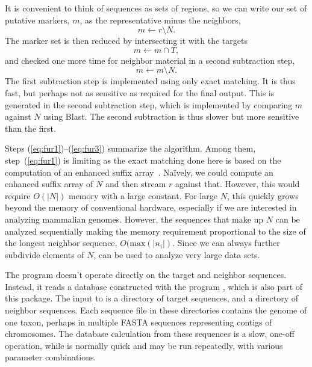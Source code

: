 It is convenient to think of sequences as sets of regions, so we can
write our set of putative markers, $m$, as the representative minus
the neighbors,
\begin{equation}\label{eq:fur1}
m \leftarrow r\setminus N.
\end{equation}
The marker set is then reduced by intersecting it with the targets
\begin{equation}\label{eq:fur2}
m \leftarrow m\cap T,
\end{equation}
and checked one more time for neighbor material in a second
subtraction step,
\begin{equation}\label{eq:fur3}
m \leftarrow m\setminus N.
\end{equation}
The first subtraction step is implemented using only exact
matching. It is thus fast, but perhaps not as sensitive as required
for the final output. This is generated in the second subtraction
step, which is implemented by comparing $m$ against $N$ using
Blast. The second subtraction is thus slower but more sensitive than
the first.

Steps (\ref{eq:fur1})--(\ref{eq:fur3}) summarize the 
algorithm. Among them, step~(\ref{eq:fur1}) is limiting as the exact
matching done here is based on the computation of an enhanced suffix
array~\cite{abo04:rep}. Naïvely, we could compute an enhanced suffix
array of $N$ and then stream $r$ against that. However, this would
require $O(|N|)$ memory with a large constant. For large $N$, this
quickly grows beyond the memory of conventional hardware, especially
if we are interested in analyzing mammalian genomes. However, the
sequences that make up $N$ can be analyzed sequentially making the
memory requirement proportional to the size of the longest neighbor
sequence, $O(\mbox{max}(|n_i|)$. Since we can always further subdivide
elements of $N$,  can be used to analyze very large data sets.

The program  doesn't operate directly on the target and
neighbor sequences. Instead, it reads a database constructed with the
program , which is also part of this package. The
input to  is a directory of target sequences, and a
directory of neighbor sequences. Each sequence file in these
directories contains the genome of one taxon, perhaps in multiple
FASTA sequences representing contigs of chromosomes. The database
calculation from these sequences is a slow, one-off operation,
while  is normally quick and may be run repeatedly, with
various parameter combinations.

